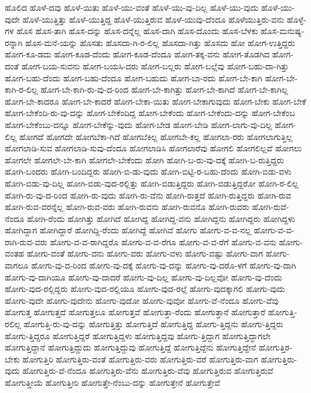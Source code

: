 {ಹೊಲಿದ
ಹೊಳೆ-ದವು
ಹೊಳೆ-ಯಿತು
ಹೊಳೆ-ಯು-ವಂತೆ
ಹೊಳೆ-ಯು-ವು-ದಿಲ್ಲ
ಹೊಳೆ-ಯು-ವುದು
ಹೊಳೆ-ಯು-ವುದೇ
ಹೊಳೆ-ಯುತ್ತಿತ್ತು
ಹೊಳೆ-ಯುತ್ತಿದ್ದ
ಹೊಳೆ-ಯುತ್ತಿರುವ
ಹೊಳೆ-ಯುವು-ದೆಂದೂ
ಹೊಳೆಯುತ್ತಿರು-ವನು
ಹೊಳ್ಳೆ-ಗಳ
ಹೊಸ
ಹೊಸ-ತಾಗಿ
ಹೊಸ-ದನ್ನು
ಹೊಸ-ದನ್ನೆಲ್ಲ
ಹೊಸ-ದಾಗಿ
ಹೊಸ-ದೊಂದು
ಹೊಸ-ಬೆಳಕು
ಹೊಸ-ಮನುಷ್ಯ-ರನ್ನಾಗಿ
ಹೊಸ-ಮನೆ-ಯನ್ನು
ಹೊಸತು
ಹೊಸದಾ-ಗಿ-ರ-ಲಿಲ್ಲ
ಹೊಸದಾ-ಗಿತ್ತು
ಹೊಸದು
ಹೋ
ಹೋಗ-ಉತ್ತಿದ್ದರು
ಹೋಗ-ಕೂ-ಡದು
ಹೋಗ-ಕೂಡ-ದೆಂದು
ಹೋಗ-ಕೂಡ-ದೆಂದೂ
ಹೋಗ-ತಕ್ಕ-ವನು
ಹೋಗ-ತೊಡಗಿದ
ಹೋಗ-ದಂತೆ
ಹೋಗ-ಬಯ-ಸುವನು
ಹೋಗ-ಬಯಸಿ-ದರು
ಹೋಗ-ಬಲ್ಲರು
ಹೋಗ-ಬಲ್ಲೆವು
ಹೋಗ-ಬಹು-ದಾ-ಗಿತ್ತು
ಹೋಗ-ಬಹು-ದೆಂದು
ಹೋಗ-ಬಹು-ದೆಂದೂ
ಹೋಗ-ಬಹುದು
ಹೋಗ-ಬಾ-ರದು
ಹೋಗ-ಬೇ-ಕಾಗಿ
ಹೋಗ-ಬೇ-ಕಾಗಿ-ರ-ಲಿಲ್ಲ
ಹೋಗ-ಬೇ-ಕಾಗಿ-ರು-ವು-ದ-ರಿಂದ
ಹೋಗ-ಬೇ-ಕಾಗಿತ್ತು
ಹೋಗ-ಬೇ-ಕಾಗಿದೆ
ಹೋಗ-ಬೇ-ಕಾಗಿಲ್ಲ
ಹೋಗ-ಬೇ-ಕಾದರೂ
ಹೋಗ-ಬೇ-ಕಾದರೆ
ಹೋಗ-ಬೇಕಾ-ಯಿತು
ಹೋಗ-ಬೇಕಾಗುವುದು
ಹೋಗ-ಬೇಕು
ಹೋಗ-ಬೇಕೆ
ಹೋಗ-ಬೇಕೆಂದಿ-ರು-ವು-ದನ್ನು
ಹೋಗ-ಬೇಕೆಂದಿದ್ದ
ಹೋಗ-ಬೇಕೆಂದು
ಹೋಗ-ಬೇಕೆಂದು-ದನ್ನು
ಹೋಗ-ಬೇಕೆಂಬ
ಹೋಗ-ಬೇಕೆಂಬು-ದನ್ನೂ
ಹೋಗ-ಬೇಕೆನ್ನು-ವುದು
ಹೋಗ-ಬೇಡ
ಹೋಗ-ಬೇಡಿ
ಹೋಗ-ಲಾಗು-ವು-ದಿಲ್ಲ
ಹೋಗ-ಲಿಲ್ಲ
ಹೋಗದೆ
ಹೋಗದೇ
ಹೋಗಬೆಕಾ-ಗಿದೆ
ಹೋಗಬೆಕಿಲ್ಲ
ಹೋಗಬೇ-ಕಲ್ಲ
ಹೋಗಲಾ-ರರು
ಹೋಗಲಾಗುತ್ತಿಲ್ಲ
ಹೋಗಲಾಡಿ-ಸುವ
ಹೋಗಲಾಡಿ-ಸುವು-ದೆಂದೂ
ಹೋಗಲಾಡಿಸಿ
ಹೋಗಲಾರೆವು
ಹೋಗಲಿ
ಹೋಗಲಿಲ್ಲವೆ
ಹೋಗಲು
ಹೋಗಲೇ
ಹೋಗಲೇ-ಬೇ-ಕಾಗಿ
ಹೋಗಲೇ-ಬೇಕೆಂದು
ಹೋಗಿ
ಹೋಗಿ-ಬ-ರು-ವು-ದಕ್ಕೆ
ಹೋಗಿ-ಬ-ರುತ್ತಿದ್ದರು
ಹೋಗಿ-ಬಂದರು
ಹೋಗಿ-ಬಂದಿದ್ದರು
ಹೋಗಿ-ಬಿ-ಡು-ವುದು
ಹೋಗಿ-ಬಿಟ್ಟಿ-ರ-ಬಹು-ದೆಂದು
ಹೋಗಿ-ಬಿಡು-ವಳು
ಹೋಗಿ-ಬಿಡು-ವು-ದಿಲ್ಲ
ಹೋಗಿ-ಬಿಡು-ವುದ-ರಲ್ಲಿತ್ತು
ಹೋಗಿ-ಬಿಡುತ್ತಿದ್ದರು
ಹೋಗಿ-ಬಿಡುತ್ತಿದ್ದರೋ
ಹೋಗಿ-ರ-ಲಿಲ್ಲ
ಹೋಗಿ-ರು-ವು-ದ-ರಿಂದ
ಹೋಗಿ-ರು-ವುದು
ಹೋಗಿ-ರು-ವೆನು
ಹೋಗಿ-ರುತ್ತದೆ
ಹೋಗಿ-ರುತ್ತಿದ್ದರು
ಹೋಗಿ-ರುವ
ಹೋಗಿ-ರುವ-ವರನ್ನೆಲ್ಲ
ಹೋಗಿ-ರುವ-ವರು
ಹೋಗಿ-ರುವನು
ಹೋಗಿ-ರುವನೊ
ಹೋಗಿ-ರುವರು
ಹೋಗಿ-ರುವೆ-ನೆಂದೂ
ಹೋಗಿ-ರೆಂದು
ಹೋಗಿತ್ತು
ಹೋಗಿದೆ
ಹೋಗಿದ್ದ
ಹೋಗಿದ್ದ-ವನು
ಹೋಗಿದ್ದನು
ಹೋಗಿದ್ದರು
ಹೋಗಿದ್ದಳು
ಹೋಗಿದ್ದಾಗ
ಹೋಗಿದ್ದಾರೆ
ಹೋಗಿದ್ದಿ-ರೆಂದು
ಹೋಗಿದ್ದೆ
ಹೋಗಿವೆ
ಹೋಗು
ಹೋಗು-ವ-ವ-ನಲ್ಲ
ಹೋಗು-ವ-ವ-ರಾಗಿ-ರುವ-ವರು
ಹೋಗು-ವ-ವ-ರಾಗಿದ್ದರೊ
ಹೋಗು-ವ-ವ-ರೆಗೂ
ಹೋಗು-ವ-ವ-ರೆಗೆ
ಹೋಗು-ವ-ವನು
ಹೋಗು-ವಂತಹ
ಹೋಗು-ವಂತೆ
ಹೋಗು-ವನು
ಹೋಗು-ವರು
ಹೋಗು-ವಳು
ಹೋಗು-ವಷ್ಟು
ಹೋಗು-ವಾಗ
ಹೋಗು-ವಾಗಲೂ
ಹೋಗು-ವು-ದ-ರಿಂದ
ಹೋಗು-ವು-ದಕ್ಕೆ
ಹೋಗು-ವು-ದನ್ನು
ಹೋಗು-ವು-ದರೊ-ಳಗೆ
ಹೋಗು-ವು-ದಾಗಿ
ಹೋಗು-ವು-ದಾಗಿಯೂ
ಹೋಗು-ವು-ದಾದರೆ
ಹೋಗು-ವು-ದಿಲ್ಲ
ಹೋಗು-ವು-ದಿಲ್ಲವೋ
ಹೋಗು-ವು-ದೆಂದು
ಹೋಗು-ವುದ-ರಲ್ಲಿದ್ದರು
ಹೋಗು-ವುದ-ರಲ್ಲಿಯೂ
ಹೋಗು-ವುದ-ರಲ್ಲೆ
ಹೋಗು-ವುದಕ್ಕಾಗಲಿ
ಹೋಗು-ವುದು
ಹೋಗು-ವುದೇ
ಹೋಗು-ವುದೇನು
ಹೋಗು-ವುದೋ
ಹೋಗು-ವುವೋ
ಹೋಗು-ವೆ-ನೆಂದೂ
ಹೋಗು-ವೆವು
ಹೋಗುತ್ತ
ಹೋಗುತ್ತದೆ
ಹೋಗುತ್ತಲೂ
ಹೋಗುತ್ತವೆ
ಹೋಗುತ್ತಾ-ರೆಂದು
ಹೋಗುತ್ತಾನೆ
ಹೋಗುತ್ತಾರೆ
ಹೋಗುತ್ತಿ-ರಲಿಲ್ಲ
ಹೋಗುತ್ತಿ-ರು-ವು-ದನ್ನು
ಹೋಗುತ್ತಿತ್ತು
ಹೋಗುತ್ತಿದೆ
ಹೋಗುತ್ತಿದ್ದ
ಹೋಗು-ತ್ತಿದ್ದನು
ಹೋಗು-ತ್ತಿದ್ದರು
ಹೋಗು-ತ್ತಿದ್ದರೂ
ಹೋಗುತ್ತಿದ್ದರೆ
ಹೋಗುತ್ತಿದ್ದಳು
ಹೋಗುತ್ತಿದ್ದವು
ಹೋಗು-ತ್ತಿದ್ದಾಗ
ಹೋಗುತ್ತಿದ್ದಾಗಲೇ
ಹೋಗುತ್ತಿದ್ದಾನೆ
ಹೋಗುತ್ತಿದ್ದುದು
ಹೋಗುತ್ತಿದ್ದುವು
ಹೋಗುತ್ತಿದ್ದೆ
ಹೋಗುತ್ತಿದ್ದೆನು
ಹೋಗುತ್ತಿದ್ದೇನೆ
ಹೋಗುತ್ತಿರ-ಬೇಕು
ಹೋಗುತ್ತಿರಿ
ಹೋಗುತ್ತಿರು-ವಂತೆ
ಹೋಗುತ್ತಿರು-ವರು
ಹೋಗುತ್ತಿರು-ವರೆ
ಹೋಗುತ್ತಿರು-ವಾಗ
ಹೋಗುತ್ತಿರು-ವುದು
ಹೋಗುತ್ತಿರು-ವೆ-ನೆಂದೂ
ಹೋಗುತ್ತಿರು-ವೆನು
ಹೋಗುತ್ತಿರು-ವೆವು
ಹೋಗುತ್ತಿರುವ
ಹೋಗುತ್ತಿರುವೆ
ಹೋಗುತ್ತೀಯೆ
ಹೋಗುತ್ತೀರಿ
ಹೋಗುತ್ತೇ-ನೆಂಬು-ದನ್ನು
ಹೋಗುತ್ತೇನೆ
ಹೋಗುತ್ತೇವೆ
}
